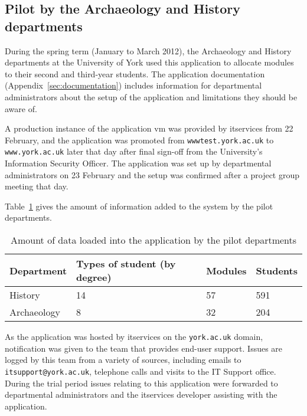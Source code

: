 
\subsection{Pilot by the Archaeology and History departments}

During the spring term (January to March 2012), the Archaeology and History
departments at the University of York used this application to allocate
modules to their second and third-year students. The application documentation
(Appendix~\ref{sec:documentation}) includes information for departmental
administrators about the setup of the application and limitations they should
be aware of.

A production instance of the application \gls{vm} was provided by
\gls{itservices} from 22 February, and the application was promoted from
\texttt{wwwtest.york.ac.uk} to \texttt{www.york.ac.uk} later that day after
final sign-off from the University's Information Security Officer. The
application was set up by departmental administrators on 23 February and the
setup was confirmed after a project group meeting that day.

Table~\ref{development_pilot_department_numbers} gives the amount of
information added to the system by the pilot departments.

\begin{table}
  \begin{center}
    \begin{tabular}{ | l | l | l | l | }
      \hline
      \textbf{Department}  & \textbf{Types of student (by degree)} & \textbf{Modules} & \textbf{Students} \\
      \hline
      History     & 14                           & 57      & 591      \\
      Archaeology & 8                            & 32      & 204      \\
      \hline
    \end{tabular}
  \end{center}
  \caption{Amount of data loaded into the application by the pilot departments}
  \label{development_pilot_department_numbers}
\end{table}

As the application was hosted by \gls{itservices} on the \texttt{york.ac.uk}
domain, notification was given to the team that provides end-user support.
Issues are logged by this team from a variety of sources, including emails to
\texttt{itsupport@york.ac.uk}, telephone calls and visits to the IT Support
office. During the trial period issues relating to this application were
forwarded to departmental administrators and the \gls{itservices} developer
assisting with the application.

